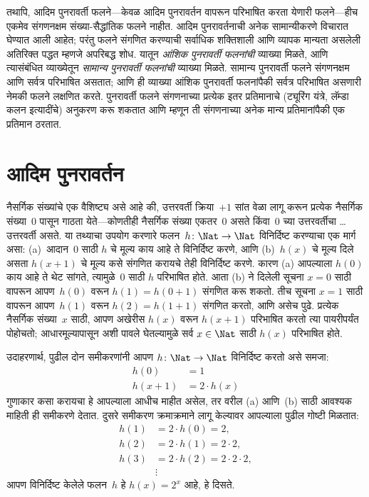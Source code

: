 तथापि, आदिम पुनरावर्ती फलने---केवळ आदिम पुनरावर्तन वापरून परिभाषित करता
येणारी फलने---हीच एकमेव संगणनक्षम संख्या-सैद्धांतिक फलने नाहीत. आदिम
पुनरावर्तनाची अनेक सामान्यीकरणे विचारात घेण्यात आली आहेत; परंतु फलने
संगणित करण्याची सर्वाधिक शक्तिशाली आणि व्यापक मान्यता असलेली अतिरिक्त
पद्धत म्हणजे अपरिबद्ध शोध. यातून \emph{आंशिक पुनरावर्ती फलनांची}
व्याख्या मिळते, आणि त्यासंबंधित व्याख्येतून \emph{सामान्य पुनरावर्ती
  फलनांची} व्याख्या मिळते. सामान्य पुनरावर्ती फलने संगणनक्षम आणि
सर्वत्र परिभाषित असतात; आणि ही व्याख्या आंशिक पुनरावर्ती फलनांपैकी
सर्वत्र परिभाषित असणारी नेमकी फलने लक्षणित करते. पुनरावर्ती फलने
संगणनाच्या प्रत्येक इतर प्रतिमानाचे (ट्यूरिंग यंत्रे, लॅम्डा कलन इत्यादींचे)
अनुकरण करू शकतात आणि म्हणून ती संगणनाच्या अनेक मान्य प्रतिमानांपैकी एक
प्रतिमान ठरतात.












\section{आदिम पुनरावर्तन}\label{cmp:rec:pre:sec}

नैसर्गिक संख्यांचे एक वैशिष्ट्य असे आहे की, उत्तरवर्ती क्रिया~$+1$
सांत वेळा लागू करून प्रत्येक नैसर्गिक संख्या~$0$ पासून गाठता येते---कोणतीही
नैसर्गिक संख्या एकतर~$0$ असते किंवा~$0$ च्या उत्तरवर्तीचा \dots{}
उत्तरवर्ती असते. या तथ्याचा उपयोग करणारे फलन~$h\colon\Nat \to \Nat$
विनिर्दिष्ट करण्याचा एक मार्ग असा: (a)~आदान~$0$ साठी $h$ चे मूल्य काय
आहे ते विनिर्दिष्ट करणे, आणि (b)~$h(x)$ चे मूल्य दिले असता $h(x+1)$ चे
मूल्य कसे संगणित करायचे तेही विनिर्दिष्ट करणे. कारण (a) आपल्याला
$h(0)$ काय आहे ते थेट सांगते, त्यामुळे~$0$ साठी $h$ परिभाषित होते.
आता (b) ने दिलेली सूचना $x=0$ साठी वापरून आपण~$h(0)$ वरून
$h(1) = h(0+1)$ संगणित करू शकतो. तीच सूचना $x=1$ साठी वापरून
आपण~$h(1)$ वरून $h(2) = h(1+1)$ संगणित करतो, आणि असेच पुढे.
प्रत्येक नैसर्गिक संख्या~$x$ साठी, आपण अखेरीस $h(x)$ वरून $h(x+1)$
परिभाषित करतो त्या पायरीपर्यंत पोहोचतो; आधारमूल्यापासून अशी पावले
घेतल्यामुळे सर्व $x \in \Nat$ साठी $h(x)$ परिभाषित होते.

उदाहरणार्थ, पुढील दोन समीकरणांनी आपण $h\colon \Nat \to \Nat$ विनिर्दिष्ट
करतो असे समजा:
\begin{align*}
h(0) & =  1\\
h(x+1) & =  2 \cdot h(x)
\end{align*}
गुणाकार कसा करायचा हे आपल्याला आधीच माहीत असेल, तर वरील (a) आणि~(b)
साठी आवश्यक माहिती ही समीकरणे देतात. दुसरे समीकरण क्रमाक्रमाने लागू
केल्यावर आपल्याला पुढील गोष्टी मिळतात:
\begin{align*}
  h(1) & = 2\cdot h(0) = 2,\\
  h(2) & = 2\cdot h(1) = 2\cdot 2,\\
  h(3) & = 2 \cdot h(2) = 2\cdot 2 \cdot 2,\\
  & \vdots
\end{align*}
आपण विनिर्दिष्ट केलेले फलन~$h$ हे $h(x) = 2^x$ आहे, हे दिसते.

